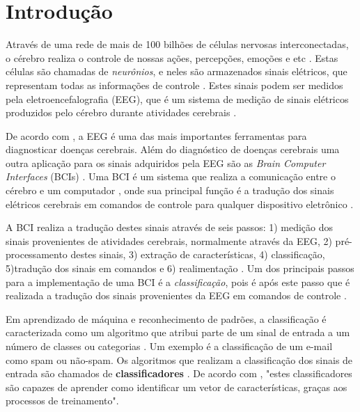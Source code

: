 \chapter[Introdução]{Introdução}

Através de uma rede de mais de 100 bilhões de células nervosas interconectadas, o cérebro realiza o controle de nossas ações, percepções, emoções e etc \cite{KANDEL}. Estas células são chamadas de \textit{neurônios}, e neles são armazenados sinais elétricos, que representam todas as informações de controle \cite{Siulybook}. Estes sinais podem ser medidos pela eletroencefalografia (EEG), que é um sistema de medição de sinais elétricos produzidos pelo cérebro durante atividades cerebrais \cite{F.Lotte}. 

De acordo com \cite{SIULYDissertacao}, a EEG é uma das mais importantes ferramentas para diagnosticar doenças cerebrais. Além do diagnóstico de doenças cerebrais uma outra aplicação para os sinais adquiridos pela EEG são as \textit{Brain Computer Interfaces} (BCIs) \cite{F.Lotte}. Uma BCI é um
sistema que realiza a comunicação entre o cérebro e um computador \cite{Siulybook}, onde sua principal função é a tradução dos sinais elétricos cerebrais em comandos de controle para qualquer dispositivo eletrônico \cite{Siulybook}.

A BCI realiza a tradução destes sinais através de seis passos: 1) medição dos sinais provenientes de atividades cerebrais, normalmente através da EEG, 2) pré-processamento destes sinais, 3) extração de características, 4) classificação, 5)tradução dos sinais em comandos e 6) realimentação \cite{MasonAndBirch}. Um dos principais passos para a implementação de uma
BCI é a \textit{classificação}, pois é após este passo que é realizada a tradução dos sinais provenientes da EEG em comandos de controle \cite{MasonAndBirch}.

Em aprendizado de máquina e reconhecimento de padrões, a classificação é caracterizada como um algoritmo que atribui parte de um sinal de entrada a um número de classes ou categorias \cite{brunelli2009template}. Um exemplo é a classificação de um e-mail como spam ou não-spam. Os algoritmos que realizam a classificação dos sinais de entrada são chamados de \textbf{classificadores} \cite{Siulybook}. De acordo com \cite[p. 41]{lottephd}, "estes classificadores são capazes de aprender como identificar um vetor de características, graças aos processos de treinamento".


